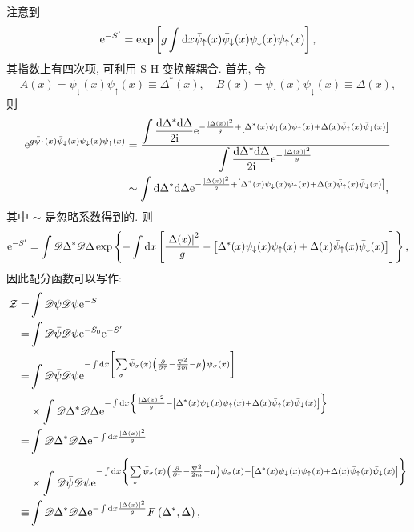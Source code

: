 注意到
\begin{equation}
 \mathrm{e}^{-S^\prime}=\exp\left[g \int \mathrm{d} x\bar{\psi}_{\uparrow}(x) \bar{\psi}_{\downarrow}(x) \psi_{\downarrow}(x) \psi_{\uparrow}(x)\right],
\end{equation}
其指数上有四次项, 可利用 S-H 变换解耦合. 首先, 令
\begin{equation}
A(x)=\psi_{\downarrow}(x) \psi_{\uparrow}(x)\equiv \Delta^*(x),\quad B(x)=\bar{\psi}_{\uparrow}(x) \bar{\psi}_{\downarrow}(x)\equiv\Delta(x),
\end{equation}
则
\begin{align}
\mathrm{e}^{g \bar{\psi}_{\uparrow}(x) \bar{\psi}_{\downarrow}(x) \psi_{\downarrow}(x) \psi_{\uparrow}(x)}&=\frac{\displaystyle\int \frac{\mathrm{d} \Delta^{*} \mathrm{d} \Delta}{2 \mathrm{i}} \mathrm{e}^{-\frac{|\Delta(x)|^{2}}{g}+\left[\Delta^{*}( x)\psi_{\downarrow}(x) \psi_{\uparrow}(x)+\Delta(x) \bar{\psi}_{\uparrow}(x) \bar{\psi}_{\downarrow}(x)\right]}} { \displaystyle\int \frac{\mathrm{d} \Delta^{*} \mathrm{d} \Delta}{2 \mathrm{i}} \mathrm{e}^{-\frac{|\Delta(x)|^{2}}{g}}}\nonumber\\
&\sim\int \mathrm{d} \Delta^{*} \mathrm{d} \Delta \mathrm{e}^{-\frac{|\Delta(x)|^{2}}{g}+\left[\Delta^{*}( x)\psi_{\downarrow}(x) \psi_{\uparrow}(x)+\Delta(x) \bar{\psi}_{\uparrow}(x) \bar{\psi}_{\downarrow}(x)\right]} ,
\end{align}
其中 $\sim$ 是忽略系数得到的. 则
\begin{equation}
\mathrm{e}^{-S^{\prime}}=\int \mathscr{D} \Delta^{*} \mathscr{D} \Delta \exp \left\{-\int \mathrm{d} x\left[\frac{\left|\Delta(x)\right|^{2}}{g}-\left[\Delta^{*}( x)\psi_{\downarrow}(x) \psi_{\uparrow}(x)+\Delta(x) \bar{\psi}_{\uparrow}(x) \bar{\psi}_{\downarrow}(x)\right]\right]\right\},
\end{equation}
因此配分函数可以写作:
\begin{align}
\mathcal{Z}=&\int \mathscr{D} \bar{\psi} \mathscr{D} \psi \mathrm{e}^{-S}\nonumber\\
=&\int \mathscr{D} \bar{\psi} \mathscr{D} \psi \mathrm{e}^{-S_{0}} \mathrm{e}^{-S^{\prime}}\nonumber\\
=&\int \mathscr{D} \bar{\psi} \mathscr{D} \psi \mathrm{e}^{-\int \mathrm{d} x\left[\sum\limits_{\sigma} \bar{\psi}_{\sigma}(x)\left(\frac{\partial}{\partial \tau}-\frac{\nabla^{2}}{2 m}-\mu\right) \psi_{\sigma}(x)\right]}\nonumber\\
&\times \int \mathscr{D} \Delta^{*} \mathscr{D} \Delta \mathrm{e}^{-\int \mathrm{d} x \left\{\frac{|\Delta(x)|^2 }{g}-\left[\Delta^{*}( x)\psi_{\downarrow}(x) \psi_{\uparrow}(x)+\Delta(x) \bar{\psi}_{\uparrow}(x) \bar{\psi}_{\downarrow}(x)\right]\right\}}\nonumber\\
=&\int \mathscr{D} \Delta^{*} \mathscr{D} \Delta \mathrm{e}^{-\int \mathrm{d} x \frac{|\Delta(x)|^2 }{g}}\nonumber\\
&\times \int \mathscr{D} \bar{\psi} \mathscr{D} \psi \mathrm{e}^{-\int \mathrm{d} x\left\{\sum\limits_{\sigma} \bar{\psi}_{\sigma}(x)\left(\frac{\partial}{\partial \tau}-\frac{\nabla^{2}}{2 m}-\mu\right) \psi_{\sigma}(x)-\left[\Delta^{*}( x)\psi_{\downarrow}(x) \psi_{\uparrow}(x)+\Delta(x) \bar{\psi}_{\uparrow}(x) \bar{\psi}_{\downarrow}(x)\right]\right\}}\nonumber\\
\equiv&\int\mathscr{D} \Delta^{*}\mathscr{D} \Delta \mathrm{e}^{-\int \mathrm{d} x \frac{|\Delta(x)|^{2}}{g}} F\left(\Delta^{*}, \Delta\right),
\end{align}
